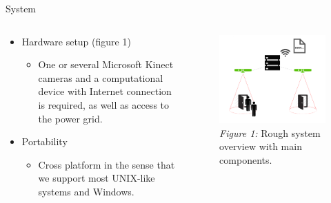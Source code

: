 \documentclass[final,hyperref={pdfpagelabels=false}]{beamer}
\begin{document}
\begin{frame}[t]
\begin{columns}[t]
\begin{column}{.465\textwidth}


\begin{block}{System}
	\begin{columns} %
		\begin{column}{.54\textwidth} %
			\begin{itemize}
				\item Hardware setup (figure 1)
				\begin{itemize}
					\item One or several Microsoft Kinect cameras and a computational device with Internet connection is required, as well as access to the power grid.
				\end{itemize}
				\item Portability
				\begin{itemize}
					\item Cross platform in the sense that we support most UNIX-like systems and Windows.
				\end{itemize}							
			\end{itemize}
		\end{column}
			
		\begin{column}{.43\textwidth} %
			\centering
			\begin{figure}
				\includegraphics[width=0.9\linewidth]{system_overview.png}
				\caption{\centering \textit{Figure 1:} Rough system overview with main components.}
			\end{figure}
		\end{column}
	\end{columns} %


\end{block}
\end{column}
\end{columns}
\end{frame}
\end{document}
